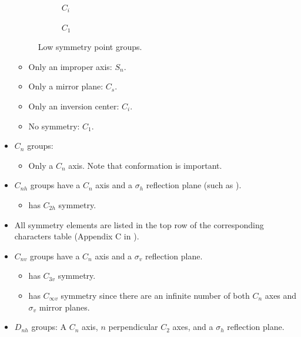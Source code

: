 \documentclass[../notes.tex]{subfiles}
\begin{document}
\begin{itemize}
\begin{figure}[h!]
\begin{subfigure}[b]{0.24\linewidth}
            \caption{$C_i$}
            \label{fig:lowSymmetryc}
        \end{subfigure}
        \begin{subfigure}[b]{0.24\linewidth}
            \centering
            \footnotesize
            \caption{$C_1$}
            \label{fig:lowSymmetryd}
        \end{subfigure}
        \caption{Low symmetry point groups.}
        \label{fig:lowSymmetry}
    \end{figure}
    \begin{itemize}
        \item Only an improper axis: $S_n$.
        \item Only a mirror plane: $C_s$.
        \item Only an inversion center: $C_i$.
        \item No symmetry: $C_1$.
    \end{itemize}
    \item $C_n$ groups:
    \begin{itemize}
        \item Only a $C_n$ axis. Note that conformation is important.
    \end{itemize}
    \item $C_{nh}$ groups have a $C_n$ axis and a $\sigma_h$ reflection plane (such as ).
    \begin{itemize}
        \item {} has $C_{2h}$ symmetry.
    \end{itemize}
    \item All symmetry elements are listed in the top row of the corresponding characters table (Appendix C in \textcite{bib:MiesslerFischerTarr}).
    \item $C_{nv}$ groups have a $C_n$ axis and a $\sigma_v$ reflection plane.
    \begin{itemize}
        \item {} has $C_{3v}$ symmetry.
        \item {} has $C_{\infty v}$ symmetry since there are an infinite number of both $C_n$ axes and $\sigma_v$ mirror planes.
    \end{itemize}
    \item $D_{nh}$ groups: A $C_n$ axis, $n$ perpendicular $C_2$ axes, and a $\sigma_h$ reflection plane.
    \begin{itemize}

\end{itemize}
\end{itemize}
\end{document}
